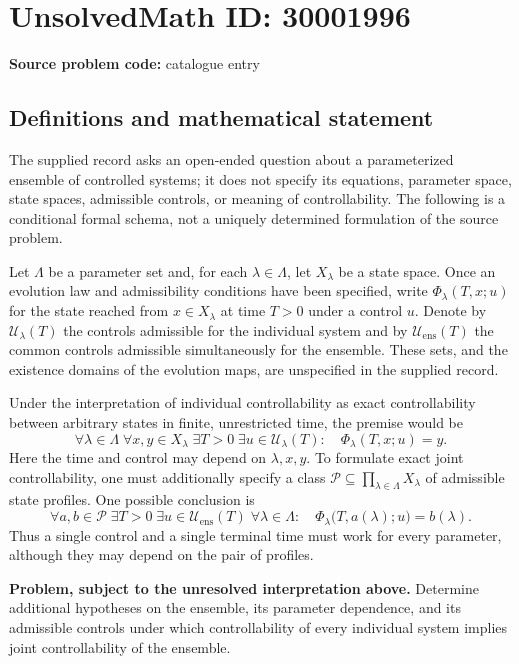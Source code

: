 \documentclass[11pt]{article}
\begin{document}
\section*{UnsolvedMath ID: 30001996}
\textbf{Source problem code:} catalogue entry
\subsection{Definitions and mathematical statement}
The supplied record asks an open-ended question about a parameterized ensemble of controlled systems; it does not specify its equations, parameter space, state spaces, admissible controls, or meaning of controllability. The following is a conditional formal schema, not a uniquely determined formulation of the source problem.

Let \(\Lambda\) be a parameter set and, for each \(\lambda\in\Lambda\), let \(X_\lambda\) be a state space. Once an evolution law and admissibility conditions have been specified, write \(\Phi_\lambda(T,x;u)\) for the state reached from \(x\in X_\lambda\) at time \(T>0\) under a control \(u\). Denote by \(\mathcal U_\lambda(T)\) the controls admissible for the individual system and by \(\mathcal U_{\mathrm{ens}}(T)\) the common controls admissible simultaneously for the ensemble. These sets, and the existence domains of the evolution maps, are unspecified in the supplied record.

Under the interpretation of individual controllability as exact controllability between arbitrary states in finite, unrestricted time, the premise would be
\[
\forall\lambda\in\Lambda\;\forall x,y\in X_\lambda\;\exists T>0\;\exists u\in\mathcal U_\lambda(T):
\quad \Phi_\lambda(T,x;u)=y.
\]
Here the time and control may depend on \(\lambda,x,y\). To formulate exact joint controllability, one must additionally specify a class \(\mathcal P\subseteq\prod_{\lambda\in\Lambda}X_\lambda\) of admissible state profiles. One possible conclusion is
\[
\forall a,b\in\mathcal P\;\exists T>0\;\exists u\in\mathcal U_{\mathrm{ens}}(T)\;\forall\lambda\in\Lambda:
\quad \Phi_\lambda\bigl(T,a(\lambda);u\bigr)=b(\lambda).
\]
Thus a single control and a single terminal time must work for every parameter, although they may depend on the pair of profiles.

\textbf{Problem, subject to the unresolved interpretation above.} Determine additional hypotheses on the ensemble, its parameter dependence, and its admissible controls under which controllability of every individual system implies joint controllability of the ensemble.
\end{document}
